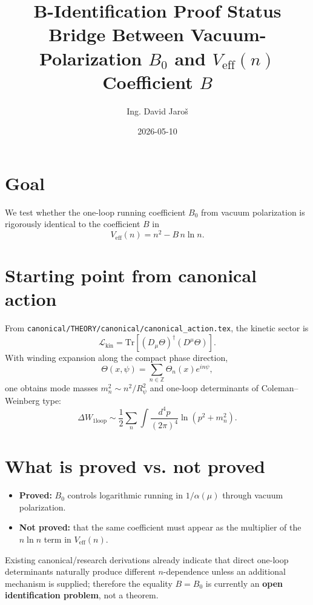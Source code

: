 \documentclass[12pt,a4paper]{article}
\title{\textbf{B-Identification Proof Status}\\
         \large Bridge Between Vacuum-Polarization $B_0$ and $V_{\mathrm{eff}}(n)$ Coefficient $B$}
\author{Ing. David Jaro\v{s}}
\date{2026-05-10}
\theoremstyle{remark}
\begin{document}
  \maketitle
\fi

\section{Goal}
We test whether the one-loop running coefficient $B_0$ from vacuum polarization
is rigorously identical to the coefficient $B$ in
\begin{equation}
V_{\mathrm{eff}}(n)=n^2-B\,n\ln n.
\end{equation}

\section{Starting point from canonical action}
From
\texttt{canonical/THEORY/canonical/canonical\_action.tex}, the kinetic sector is
\begin{equation}
\mathcal{L}_{\mathrm{kin}}=\mathrm{Tr}\!\left[(D_\mu\Theta)^\dagger(D^\mu\Theta)\right].
\end{equation}
With winding expansion along the compact phase direction,
\begin{equation}
\Theta(x,\psi)=\sum_{n\in\mathbb{Z}}\Theta_n(x)e^{in\psi},
\end{equation}
one obtains mode masses $m_n^2\sim n^2/R_\psi^2$ and one-loop determinants of
Coleman--Weinberg type:
\begin{equation}
\Delta W_{\mathrm{1loop}}\sim \frac{1}{2}\sum_n\int\frac{d^4p}{(2\pi)^4}\ln\left(p^2+m_n^2\right).
\end{equation}

\section{What is proved vs. not proved}
\begin{itemize}
  \item \textbf{Proved:} $B_0$ controls logarithmic running in
  $1/\alpha(\mu)$ through vacuum polarization.
  \item \textbf{Not proved:} that the same coefficient must appear as the
  multiplier of the $n\ln n$ term in $V_{\mathrm{eff}}(n)$.
\end{itemize}

Existing canonical/research derivations already indicate that direct
one-loop determinants naturally produce different $n$-dependence unless an
additional mechanism is supplied; therefore the equality $B=B_0$ is currently
an \textbf{open identification problem}, not a theorem.
\end{document}
